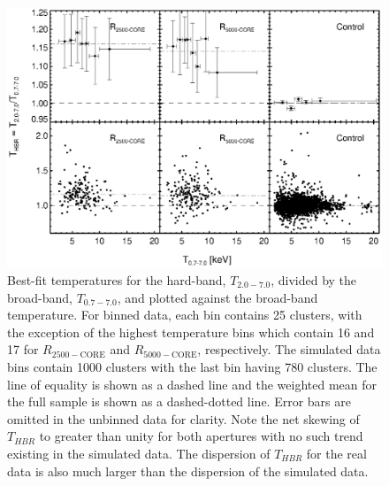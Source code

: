 \clearpage
\begin{figure}[htp]
\begin{center}
\includegraphics[scale=1.0]{ftxcount}
\caption{\small
Best-fit temperatures for the hard-band, $T_{2.0-7.0}$, divided by the
broad-band, $T_{0.7-7.0}$, and plotted against the broad-band
temperature. For binned data, each bin contains 25 clusters, with the
exception of the highest temperature bins which contain 16 and 17 for
$R_{2500-\mathrm{CORE}}$ and $R_{5000-\mathrm{CORE}}$, respectively. The
simulated data bins contain 1000 clusters with the last bin having 780
clusters. The line of equality is shown as a dashed line and the
weighted mean for the full sample is shown as a dashed-dotted
line. Error bars are omitted in the unbinned data for clarity. Note
the net skewing of $T_{HBR}$ to greater than unity for both apertures
with no such trend existing in the simulated data. The dispersion of
$T_{HBR}$ for the real data is also much larger than the dispersion of
the simulated data.
}
\label{fig:ftx}
\end{center}
\end{figure}

